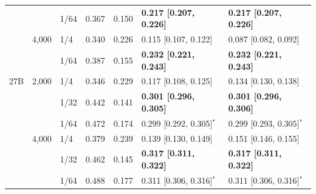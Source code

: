 \begin{table}[!htbp]
\begin{tabular}{@{}lll*{2}{@{\hspace{5pt}}r}*{2}{@{\hspace{5pt}}l}@{}}
    & & 1/64 & 0.367 & 0.150 & \textbf{0.217 [0.207, 0.226]} & \textbf{0.217 [0.207, 0.226]} \\
    & 4,000 & 1/4 & 0.340 & 0.226 & 0.115 [0.107, 0.122] & 0.087 [0.082, 0.092] \\
    & & 1/64 & 0.387 & 0.155 & \textbf{0.232 [0.221, 0.243]} & \textbf{0.232 [0.221, 0.243]} \\
    27B & 2,000 & 1/4 & 0.346 & 0.229 & 0.117 [0.108, 0.125] & 0.134 [0.130, 0.138] \\
    & & 1/32 & 0.442 & 0.141 & \textbf{0.301 [0.296, 0.305]} & \textbf{0.301 [0.296, 0.306]} \\
    & & 1/64 & 0.472 & 0.174 & 0.299 [0.292, 0.305]$^\ast$ & 0.299 [0.293, 0.305]$^\ast$ \\
    & 4,000 & 1/4 & 0.379 & 0.239 & 0.139 [0.130, 0.149] & 0.151 [0.146, 0.155] \\
    & & 1/32 & 0.462 & 0.145 & \textbf{0.317 [0.311, 0.322]} & \textbf{0.317 [0.311, 0.322]} \\
    & & 1/64 & 0.488 & 0.177 & 0.311 [0.306, 0.316]$^\ast$ & 0.311 [0.306, 0.316]$^\ast$ \\
    \bottomrule
  \end{tabular}
\end{table}

